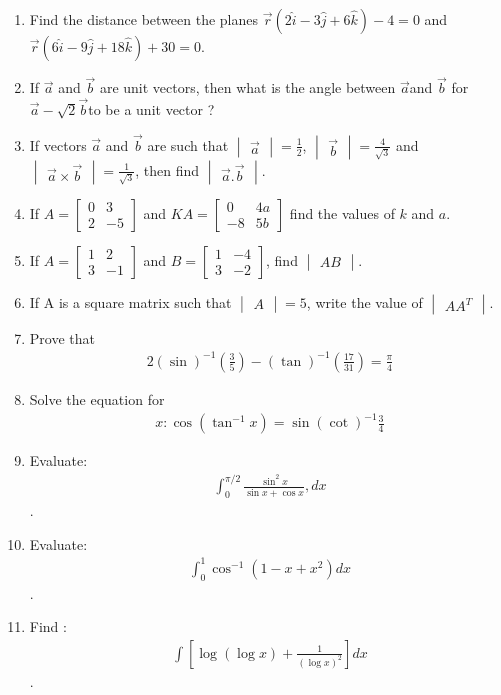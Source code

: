 \documentclass[12pt,-letter paper]{article}
\providecommand{\mydet}[1]{\ensuremath{\begin{vmatrix}#1\end{vmatrix}}}
\providecommand{\myvec}[1]{\ensuremath{\begin{bmatrix}#1\end{bmatrix}}}
\begin{document}
\begin{enumerate}
	\item Find the distance between the planes $\overset{\rightarrow}{r}(2\hat{i}-3\hat{j}+6\hat{k})-4= 0$ and $\overset{\rightarrow}{r}(6\hat{i}-9\hat{j}+18\hat{k})+30=0$.
	\item If $\overset{\rightarrow}{a}$ and $\overset{\rightarrow}{b}$ are unit vectors, then what is the angle between $\overset{\rightarrow}{a}$and $\overset{\rightarrow}{b}$ for $\overset{\rightarrow}{a}-\sqrt{2}  \overset{\rightarrow}{b}$to be a unit vector ?
	\item If vectors $\overset{\rightarrow}{a}$ and $\overset{\rightarrow}{b}$ are such that $\mydet{\overset{\rightarrow}{a}}=\frac{1}{2}$, $\mydet{\overset{\rightarrow}{b}}=\frac{4}{\sqrt{3}}$ and $\mydet{\overset{\rightarrow}{a} \times \overset{\rightarrow}{b}}=\frac{1}{\sqrt{3}}$, then find $\mydet{\overset{\rightarrow}{a}.\overset{\rightarrow}{b}}$.
\item If $A=\myvec{0 & 3 \\ 2 & -5}$ and $KA=\myvec{0 & 4a \\ 
    -8 & 5b }$ find the values of $k$ and $a$.
\item If $A=\myvec{1 & 2 \\ 3 & -1}$ and  $B = \myvec {1 & -4 \\ 3 & -2 }    $, find $\mydet{AB}$.
\item If A is a square matrix such that $\mydet{A}=5$, write the value of $\mydet{AA^T}$.
\item Prove that 
	\begin{align*} 2(\sin)^{-1} (\frac{3}{5})-(\tan)^{-1}(\frac{17}{31})=\frac{\pi}{4} 
	\end{align*}
\item Solve the equation for \begin{align*}x:\cos(\tan^{-1} x)=\sin(\cot)^{-1}\frac{3}{4}\end{align*}
\item Evaluate: \begin{align*}\int_{0}^{\pi/2} \frac{\sin^2{x}}{\sin{x} + \cos{x}},dx\end{align*}.
	\item Evaluate: \begin{align*}\int_{0}^{1} \cos^{-1}(1-x+x^2)dx \end{align*}.
\item Find : \begin{align*}\int[\log(\log{x})+\frac{1}{(\log{x})^2}]dx\end{align*}.

\end{enumerate}
\end{document}
